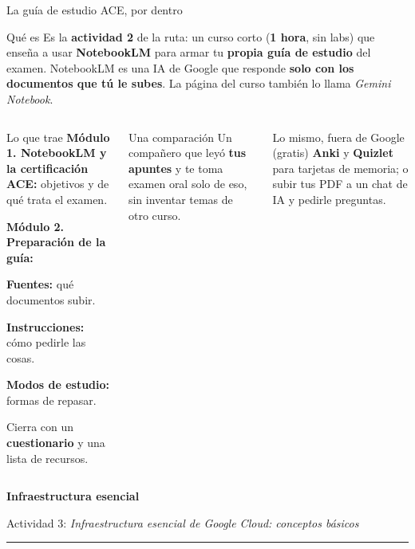 \documentclass[aspectratio=169,10pt,c]{beamer}
\begin{document}
\begin{frame}{La guía de estudio ACE, por dentro}
\begin{block}{Qué es}
\small Es la \textbf{actividad 2} de la ruta: un curso corto (\textbf{1 hora}, sin labs) que enseña a usar \textbf{NotebookLM} para armar tu \textbf{propia guía de estudio} del examen. NotebookLM es una IA de Google que responde \textbf{solo con los documentos que tú le subes}. La página del curso también lo llama \emph{Gemini Notebook}.
\end{block}
\begin{columns}[T,onlytextwidth]
\begin{exampleblock}{Lo que trae}
\small
\textbf{Módulo 1. NotebookLM y la certificación ACE:} objetivos y de qué trata el examen.\par\smallskip
\textbf{Módulo 2. Preparación de la guía:}\par
\textbf{Fuentes:} qué documentos subir.\par
\textbf{Instrucciones:} cómo pedirle las cosas.\par
\textbf{Modos de estudio:} formas de repasar.\par\smallskip
Cierra con un \textbf{cuestionario} y una lista de recursos.
\end{exampleblock}
\begin{block}{Una comparación}
\small Un compañero que leyó \textbf{tus apuntes} y te toma examen oral solo de eso, sin inventar temas de otro curso.
\end{block}
\begin{alertblock}{Lo mismo, fuera de Google (gratis)}
\small \textbf{Anki} y \textbf{Quizlet} para tarjetas de memoria; o subir tus PDF a un chat de IA y pedirle preguntas.
\end{alertblock}
\end{columns}
\end{frame}

\begin{frame}[plain]
\vfill
\begin{center}
{\fontsize{29}{34}\selectfont\bfseries Infraestructura esencial}\par
\vspace{2mm}
{\small Actividad 3: \emph{Infraestructura esencial de Google Cloud: conceptos básicos}}\par
\vspace{4mm}
{\color{utpRojo}\rule{8.5cm}{1.2pt}}
\end{center}
\vfill
\end{frame}
\end{document}
